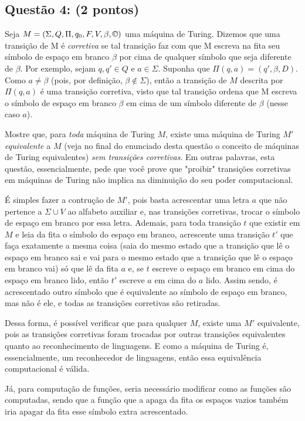 \documentclass{article}
\begin{document}
\subsection*{Questão 4: (2 pontos)} Seja $M = (\Sigma, Q, \Pi, q_0, F, V, \beta, \copyright)$ uma máquina de Turing. Dizemos que uma transição de M é \textit{corretiva} se tal transição faz com que M escreva na fita seu símbolo de espaço em branco $\beta$ por cima de qualquer símbolo que seja diferente de $\beta$. Por exemplo, sejam $q, q' \in Q$ e $a \in \Sigma$. Suponha que $\Pi(q, a) = (q', \beta, D)$. Como $a \neq \beta$ (pois, por definição, $\beta \notin \Sigma$), então a transição de $M$ descrita por $\Pi(q, a)$ é uma transição corretiva, visto que tal transição ordena que M escreva o símbolo de espaço em branco $\beta$ em cima de um símbolo diferente de $\beta$ (nesse caso $a$).
\par Mostre que, para \textit{toda} máquina de Turing $M$, existe uma máquina de Turing $M'$ \textit{equivalente} a $M$ (veja no final do enunciado desta questão o conceito de máquinas de Turing equivalentes) \textit{sem transições corretivas}. Em outras palavras, esta questão, essencialmente, pede que você prove que "proibir" transições corretivas em máquinas de Turing não implica na diminuição do seu poder computacional.

{
\color{blue}
  \par É simples fazer a contrução de $M'$, pois basta acrescentar uma letra $a$ que não pertence a $\Sigma \cup V$ ao alfabeto auxiliar e, nas transições corretivas, trocar o símbolo de espaço em branco por essa letra. Ademais, para toda transição $t$ que existir em $M$ e leia da fita o símbolo do espaço em branco, acrescente uma transição $t'$ que faça exatamente a mesma coisa (saia do mesmo estado que a transição que lê o espaço em branco sai e vai para o mesmo estado que a transição que lê o espaço em branco vai) só que lê da fita $a$ e, se $t$ escreve o espaço em branco em cima do espaço em branco lido, então $t'$ escreve $a$ em cima do $a$ lido. Assim sendo, é acrescentado outro símbolo que é equivalente ao símbolo de espaço em branco, mas não é ele, e todas as transições corretivas são retiradas.
  \par Dessa forma, é possível verificar que para qualquer $M$, existe uma $M'$ equivalente, pois as transições corretivas foram trocadas por outras transições equivalentes quanto ao reconhecimento de linguagens. E como a máquina de Turing é, essencialmente, um reconhecedor de linguagens, então essa equivalência computacional é válida.
  \par Já, para computação de funções, seria necessário modificar como as funções são computadas, sendo que a função que a apaga da fita os espaços vazios também iria apagar da fita esse símbolo extra acrescentado.
}
\end{document}
